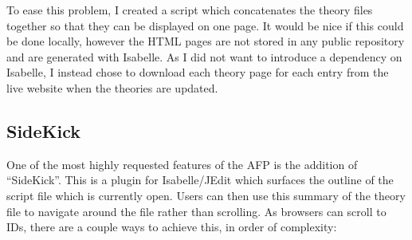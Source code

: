 \documentclass[bsc,frontabs,oneside,singlespacing,parskip,deptreport,logo]{infthesis}
\begin{document}
To ease this problem, I created a script which concatenates the theory files together so that they can be displayed on one page. It would be nice if this could be done locally, however the HTML pages are not stored in any public repository and are generated with Isabelle. As I did not want to introduce a  dependency on Isabelle, I instead chose to download each theory page for each entry from the live website when the theories are updated.

\subsection{SideKick} \label{SideKick}

One of the most highly requested features of the AFP is the addition of ``SideKick''. This is a plugin for Isabelle/JEdit which surfaces the outline of the script file which is currently open. Users can then use this summary of the theory file to navigate around the file rather than scrolling.
\cbstart
As browsers can scroll to IDs, there are a couple ways to achieve this, in order of complexity:

\end{document}
